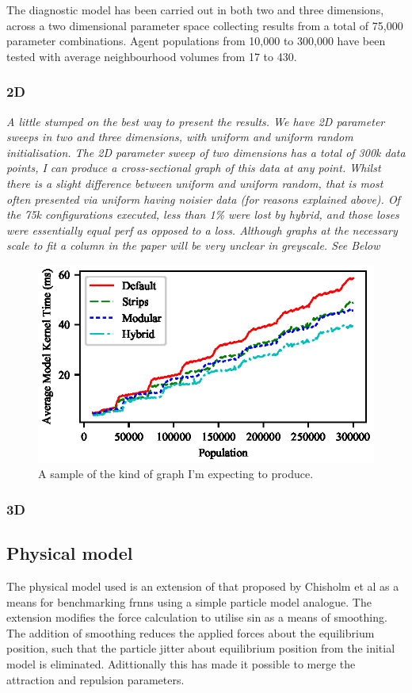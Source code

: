     The diagnostic model has been carried out in both two and three dimensions, across a two dimensional parameter space collecting results from a total of 75,000 parameter combinations. Agent populations from 10,000 to 300,000 have been tested with average neighbourhood volumes from 17 to 430.
    \subsubsection{2D}
      
      \textit{A little stumped on the best way to present the results. We have 2D parameter sweeps in two and three dimensions, with uniform and uniform random initialisation. The 2D parameter sweep of two dimensions has a total of 300k data points, I can produce a cross-sectional graph of this data at any point. Whilst there is a slight difference between uniform and uniform random, that is most often presented via uniform having noisier data (for reasons explained above). Of the 75k configurations executed, less than 1\% were lost by hybrid, and those loses were essentially equal perf as opposed to a loss. Although graphs at the necessary scale to fit a column in the paper will be very unclear in greyscale. See Below}

\begin{figure}[!t]
\centering
\includegraphics[width=\linewidth]{../resources/results/sample.eps}
\caption{\label{fig:sample-graph}A sample of the kind of graph I'm expecting to produce.}
\end{figure}
    \subsubsection{3D}

  \subsection{Physical model}
    The physical model used is an extension of that proposed by Chisholm et al as a means for benchmarking \gls{frnns} using a simple particle model analogue.\cite{CRM16} The extension modifies the force calculation to utilise sin as a means of smoothing. The addition of smoothing reduces the applied forces about the equilibrium position, such that the particle jitter about equilibrium position from the initial model is eliminated. Adittionally this has made it possible to merge the attraction and repulsion parameters.
    
